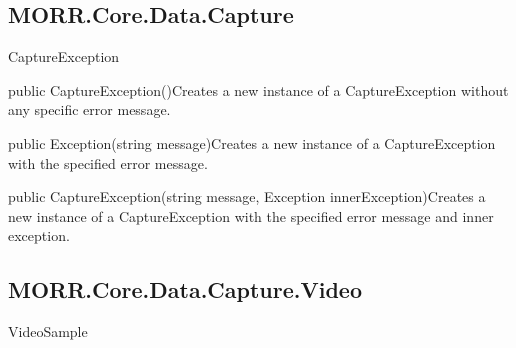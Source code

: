 \subsection*{MORR.Core.Data.Capture}

\begin{class}{CaptureException}


    
    \begin{constructors}
        \begin{constructor}{public CaptureException()}{Creates a new instance of a CaptureException without any specific error message.}
        \end{constructor}
        \begin{constructor}{public Exception(string message)}{Creates a new instance of a CaptureException with the specified error message.}
            \begin{parameters}
            \end{parameters}
        \end{constructor}
        \begin{constructor}{public CaptureException(string message, Exception innerException)}{Creates a new instance of a CaptureException with the specified error message and inner exception.}
            \begin{parameters}
            \end{parameters}
        \end{constructor}
    \end{constructors}
\end{class}

\subsection*{MORR.Core.Data.Capture.Video}

\begin{class}{VideoSample}


\end{class}

